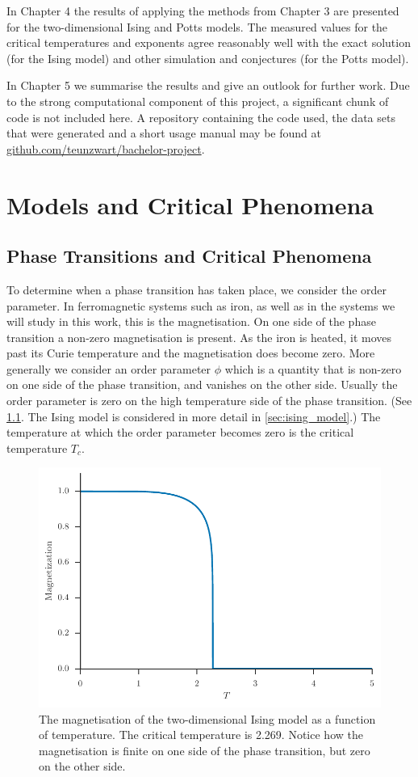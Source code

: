 \documentclass[11pt, a4paper]{report} %
\begin{document}
In Chapter 4 the results of applying the methods from Chapter 3 are presented for the two-dimensional Ising and Potts models.
The measured values for the critical temperatures and exponents agree reasonably well with the exact solution (for the Ising model) and other simulation and conjectures (for the Potts model).

In Chapter 5 we summarise the results and give an outlook for further work.
Due to the strong computational component of this project, a significant chunk of code is not included here.
A repository containing the code used, the data sets that were generated and a short usage manual may be found at \url{github.com/teunzwart/bachelor-project}.


\chapter{Models and Critical Phenomena}

\section{Phase Transitions and Critical Phenomena}
To determine when a phase transition has taken place, we consider the order parameter.
In ferromagnetic systems such as iron, as well as in the systems we will study in this work, this is the magnetisation.
On one side of the phase transition a non-zero magnetisation is present.
As the iron is heated, it moves past its Curie temperature and the magnetisation does become zero.
More generally we consider an order parameter \(\phi\) which is a quantity that is non-zero on one side of the phase transition, and vanishes  on the other side. Usually the order parameter is zero on the high temperature side of the phase transition. (See \cref{fig:ising_magnetization}. The Ising model is considered in more detail in \cref{sec:ising_model}.)
The temperature at which the order parameter becomes zero is the critical temperature \(T_c\).
\begin{figure}[htb]
	\centering
	\includegraphics[width=\linewidth]{ising_magnetization}
	\caption{The magnetisation of the two-dimensional Ising model as a function of temperature. The critical temperature is 2.269. Notice how the magnetisation is finite on one side of the phase transition, but zero on the other side.}
	\label{fig:ising_magnetization}
\end{figure}
\end{document}
